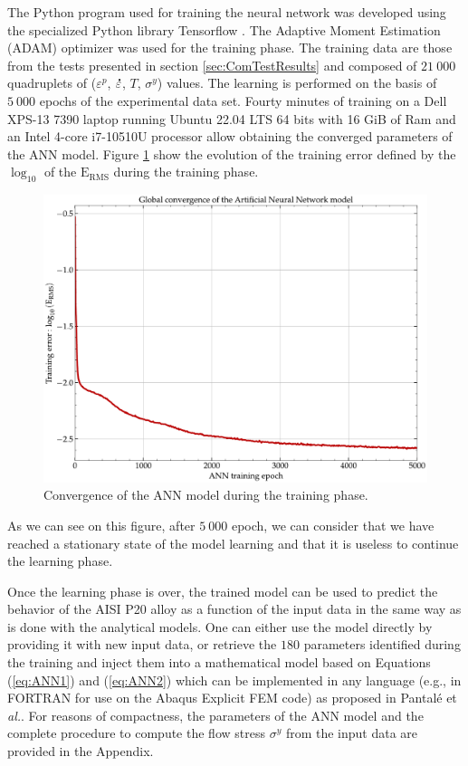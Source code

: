 \documentclass[twoside,english,1p,final,sort&compress]{elsarticle}
\makeatletter
\theoremstyle{plain}
\DeclareRobustCommand{\mdot}[1]{\accentset{\mbox{\bfseries .}}{#1}}
\DeclareRobustCommand{\eal}{et \emph{al.}\@\xspace}
\DeclareRobustCommand{\eg}{e.g.,\@\xspace}
\DeclareRobustCommand{\RMSE}{\text{E}_\text{RMS}}
\makeatother
\begin{document}
The Python program used for training the neural network was developed using the specialized Python library Tensorflow \cite{Abadi-2016}.
The Adaptive Moment Estimation (ADAM) optimizer \cite{Kingma-2015} was used for the training phase.
The training data are those from the tests presented in section \ref{sec:ComTestResults} and composed of $21~000$ quadruplets of ($\varepsilon^p$, $\mdot\varepsilon$, $T$, $\sigma^y$) values.
The learning is performed on the basis of $5~000$ epochs of the experimental data set.
Fourty minutes of training on a Dell XPS-13 7390 laptop running Ubuntu 22.04 LTS 64 bits with 16 GiB of Ram and an Intel 4-core i7-10510U processor allow obtaining the converged parameters of the ANN model.
Figure \ref{fig:ANN-6-conv} show the evolution of the training error defined by the $\log_{10}$ of the $\RMSE$  during the training phase.
\begin{figure}[!ht]
\centering
\includegraphics[width=0.7\columnwidth]
{Figures/Conv-ANN-6}
\caption{Convergence of the ANN model during the training phase.}
\label{fig:ANN-6-conv}
\end{figure}
As we can see on this figure, after $5~000$ epoch, we can consider that we have reached a stationary state of the model learning and that it is useless to continue the learning phase.

Once the learning phase is over, the trained model can be used to predict the behavior of the AISI P20 alloy as a function of the input data in the same way as is done with the analytical models.
One can either use the model directly by providing it with new input data, or retrieve the $180$ parameters identified during the training and inject them into a mathematical model based on Equations (\ref{eq:ANN1}) and (\ref{eq:ANN2}) which can be implemented in any language (\eg in FORTRAN for use on the Abaqus Explicit FEM code) as proposed in Pantalé \eal \cite{Pantale-2021}.
For reasons of compactness, the parameters of the ANN model and the complete procedure to compute the flow stress $\sigma^y$ from the input data are provided in the Appendix.
\end{document}
